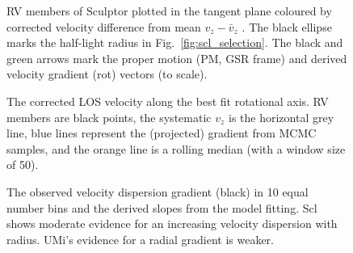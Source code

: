 \begin{figure}
\centering
{}
\caption[Scl velocity sample]{RV members of Sculptor plotted in the
tangent plane coloured by corrected velocity difference from mean
\(v_z - \bar v_z\) . The black ellipse marks the half-light radius in
Fig.~\ref{fig:scl_selection}. The black and green arrows mark the proper
motion (PM, GSR frame) and derived velocity gradient (rot) vectors (to
scale).}
\end{figure}

\begin{figure}
\centering
{}
\caption[Scl velocity gradient]{The corrected LOS velocity along the
best fit rotational axis. RV members are black points, the systematic
\(v_z\) is the horizontal grey line, blue lines represent the
(projected) gradient from MCMC samples, and the orange line is a rolling
median (with a window size of 50).}
\end{figure}

\begin{figure}
\centering
{}
\caption[Possible gradients in the velocity dispersion]{The observed
velocity dispersion gradient (black) in 10 equal number bins and the
derived slopes from the model fitting. Scl shows moderate evidence for
an increasing velocity dispersion with radius. UMi's evidence for a
radial gradient is weaker.}
\end{figure}
